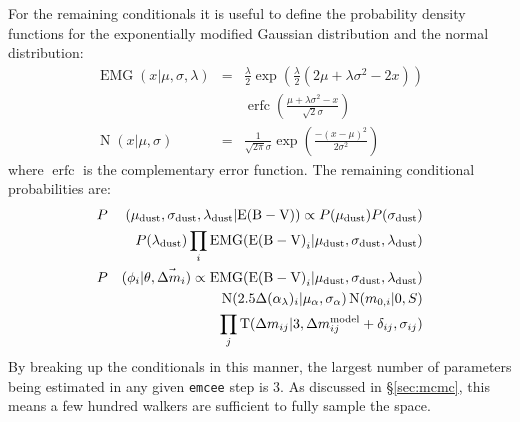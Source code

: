 For the remaining conditionals it is useful to define the probability density functions for the exponentially modified Gaussian distribution and the normal distribution:
\begin{eqnarray}
 \operatorname{EMG}(x|\mu,\sigma,\lambda) &=& \frac{\lambda}{2} \exp{\left(\frac{\lambda}{2} (2\mu+\lambda \sigma^2-2x) \right)} \nonumber \\
 & &\operatorname{erfc}\left( \frac{\mu+\lambda \sigma^2-x}{\sqrt{2} \sigma} \right) \\
 \operatorname{N}(x|\mu,\sigma) &=& \frac{1}{\sqrt{2\pi}\sigma} \exp{\left(\frac{-(x-\mu)^2}{2\sigma^2} \right)} 
\end{eqnarray}
where $\operatorname{erfc}$ is the complementary error function. The remaining conditional probabilities are:
\begin{eqnarray}
 &P&(\mu_{\rm dust},\sigma_{\rm dust},\lambda_{\rm dust}|\ebv) \propto P(\mu_{\rm dust})P(\sigma_{\rm dust}) \nonumber \\
& &P(\lambda_{\rm dust}) \prod_i \operatorname{EMG}(\ebv_i|\mu_{\rm dust},\sigma_{\rm dust},\lambda_{\rm dust})  \label{eqn:mcmc_data_eqn11} \\
 &P&(\phi_i|\theta,\vec{\mrel_i}) \propto \operatorname{EMG}(\ebv_i|\mu_{\rm dust},\sigma_{\rm dust},\lambda_{\rm dust}) \nonumber \\
& & \operatorname{N}(2.5\dal_i|\mu_{\alpha},\sigma_{\alpha}) \operatorname{N}(m_{0,i}|0,S) \nonumber \\
& & \prod_j \operatorname{T}(\mrel_{ij}|3,\mrel_{ij}^{\rm model}+\delta_{ij},\sigma_{ij})  \label{eqn:mcmc_data_eqn12}
\end{eqnarray}
By breaking up the conditionals in this manner, the largest number of parameters being estimated in any given \texttt{emcee} step is 3.  As discussed in \S\ref{sec:mcmc}, this means a few hundred walkers are sufficient to fully sample the space.

